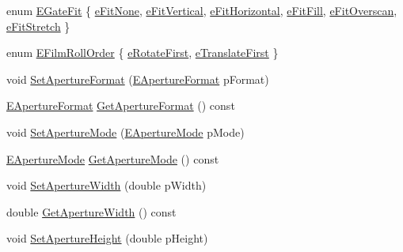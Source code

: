 \begin{DoxyCompactItemize}
enum \hyperlink{class_fbx_camera_aeef0bf29c16fe5f08815fb33402330dd}{E\+Gate\+Fit} \{ \newline
\hyperlink{class_fbx_camera_aeef0bf29c16fe5f08815fb33402330dda3323d147bda3dd5b2b196bbbf877f893}{e\+Fit\+None}, 
\hyperlink{class_fbx_camera_aeef0bf29c16fe5f08815fb33402330ddaf68c2ba0074eeaccec333cc9edf3541c}{e\+Fit\+Vertical}, 
\hyperlink{class_fbx_camera_aeef0bf29c16fe5f08815fb33402330ddac719810a0f5527e1a8e1d0a07b83b52e}{e\+Fit\+Horizontal}, 
\hyperlink{class_fbx_camera_aeef0bf29c16fe5f08815fb33402330dda0ee709a0e8ce6d10c93eead0c24fea5e}{e\+Fit\+Fill}, 
\newline
\hyperlink{class_fbx_camera_aeef0bf29c16fe5f08815fb33402330ddadf50234dabf691041535be304a4fffce}{e\+Fit\+Overscan}, 
\hyperlink{class_fbx_camera_aeef0bf29c16fe5f08815fb33402330dda2c54aaf5f566bae17a288ce14733c66a}{e\+Fit\+Stretch}
 \}
\item 
enum \hyperlink{class_fbx_camera_a831d9b7ffcbf3611715eb2ad9108870b}{E\+Film\+Roll\+Order} \{ \hyperlink{class_fbx_camera_a831d9b7ffcbf3611715eb2ad9108870bad500528c8c031dde3349136db2fae5d1}{e\+Rotate\+First}, 
\hyperlink{class_fbx_camera_a831d9b7ffcbf3611715eb2ad9108870ba7e8e7f860d61236b2a6cc8300953b071}{e\+Translate\+First}
 \}
\item 
void \hyperlink{class_fbx_camera_a5b644b41e4d72c214acfdb5a2dee7576}{Set\+Aperture\+Format} (\hyperlink{class_fbx_camera_ac26ac89602453c5917882c69d4863d13}{E\+Aperture\+Format} p\+Format)
\item 
\hyperlink{class_fbx_camera_ac26ac89602453c5917882c69d4863d13}{E\+Aperture\+Format} \hyperlink{class_fbx_camera_a33f198a1cb447a1e1e41d69856a7291c}{Get\+Aperture\+Format} () const
\item 
void \hyperlink{class_fbx_camera_a479485801a0795d337d73e25ef8c4477}{Set\+Aperture\+Mode} (\hyperlink{class_fbx_camera_addeea6fc943ce5f087dbc54c142f890e}{E\+Aperture\+Mode} p\+Mode)
\item 
\hyperlink{class_fbx_camera_addeea6fc943ce5f087dbc54c142f890e}{E\+Aperture\+Mode} \hyperlink{class_fbx_camera_a3dea5cf232d8faafbc4c5a720fde419c}{Get\+Aperture\+Mode} () const
\item 
void \hyperlink{class_fbx_camera_ae927c1d64d3b28cce554d47ac56fdc92}{Set\+Aperture\+Width} (double p\+Width)
\item 
double \hyperlink{class_fbx_camera_a7f9c7299e3a40cf708e97b13107396cc}{Get\+Aperture\+Width} () const
\item 
void \hyperlink{class_fbx_camera_a02bdb12abf27b4ccc0c4554818bdbf8f}{Set\+Aperture\+Height} (double p\+Height)

\end{DoxyCompactItemize}
